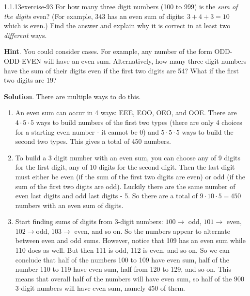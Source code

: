 \documentclass[twoside,11pt,]{book}
\numberwithin{equation}{chapter}
\begin{document}
\begin{divisionsolution}{1.1.13}{}{exercise-93}%
\hypertarget{p-1426}{}%
For how many three digit numbers (100 to 999) is the \emph{sum of the digits} even? (For example, \(343\) has an even sum of digits: \(3+4+3 = 10\) which is even.) Find the answer and explain why it is correct in at least two \emph{different} ways.%
\par\smallskip%
\noindent\textbf{Hint}.\quad%
\hypertarget{p-1427}{}%
You could consider cases.  For example, any number of the form ODD-ODD-EVEN will have an even sum.  Alternatively, how many three digit numbers have the sum of their digits even if the first two digits are 54?  What if the first two digits are 19?%
\par\smallskip%
\noindent\textbf{Solution}.\quad%
\hypertarget{p-1428}{}%
There are multiple ways to do this.\leavevmode%
\begin{enumerate}[label=(\alph*)]
\item\hypertarget{li-1036}{}\hypertarget{p-1429}{}%
An even sum can occur in 4 ways: EEE, EOO, OEO, and OOE. There are \(4 \cdot 5 \cdot 5\) ways to build numbers of the first two types (there are only 4 choices for a starting even number - it cannot be 0) and \(5 \cdot 5 \cdot 5\) ways to build the second two types. This gives a total of 450 numbers.%
\item\hypertarget{li-1037}{}\hypertarget{p-1430}{}%
To build a 3 digit number with an even sum, you can choose any of 9 digits for the first digit, any of 10 digits for the second digit. Then the last digit must either be even (if the sum of the first two digits are even) or odd (if the sum of the first two digits are odd). Luckily there are the same number of even last digits and odd last digits - 5. So there are a total of \(9 \cdot 10 \cdot 5 = 450\) numbers with an even sum of digits.%
\item\hypertarget{li-1038}{}\hypertarget{p-1431}{}%
Start finding sums of digits from 3-digit numbers: \(100 \to\) odd, \(101 \to\) even, \(102 \to\)odd, \(103 \to\) even, and so on. So the numbers appear to alternate between even and odd sums. However, notice that 109 has an even sum while 110 does as well. But then 111 is odd, 112 is even, and so on. So we can conclude that half of the numbers 100 to 109 have even sum, half of the number 110 to 119 have even sum, half from 120 to 129, and so on. This means that overall half of the numbers will have even sum, so half of the 900 3-digit numbers will have even sum, namely 450 of them.%
\end{enumerate}
%
\end{divisionsolution}%
\end{document}
